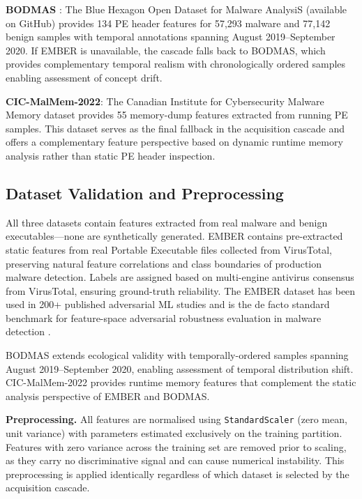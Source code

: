 \documentclass[conference]{IEEEtran}
\begin{document}
\textbf{BODMAS} \cite{yang2021}: The Blue Hexagon Open Dataset for Malware AnalysiS (available on GitHub) provides 134 PE header features for 57,293 malware and 77,142 benign samples with temporal annotations spanning August 2019--September 2020. If EMBER is unavailable, the cascade falls back to BODMAS, which provides complementary temporal realism with chronologically ordered samples enabling assessment of concept drift.

\textbf{CIC-MalMem-2022}: The Canadian Institute for Cybersecurity Malware Memory dataset provides 55 memory-dump features extracted from running PE samples. This dataset serves as the final fallback in the acquisition cascade and offers a complementary feature perspective based on dynamic runtime memory analysis rather than static PE header inspection.

\subsection{Dataset Validation and Preprocessing}

All three datasets contain features extracted from real malware and benign executables---none are synthetically generated. EMBER contains pre-extracted static features from real Portable Executable files collected from VirusTotal, preserving natural feature correlations and class boundaries of production malware detection. Labels are assigned based on multi-engine antivirus consensus from VirusTotal, ensuring ground-truth reliability. The EMBER dataset has been used in 200+ published adversarial ML studies and is the de facto standard benchmark for feature-space adversarial robustness evaluation in malware detection \cite{anderson2018}.

BODMAS extends ecological validity with temporally-ordered samples spanning August 2019--September 2020, enabling assessment of temporal distribution shift. CIC-MalMem-2022 provides runtime memory features that complement the static analysis perspective of EMBER and BODMAS.

\textbf{Preprocessing.} All features are normalised using \texttt{StandardScaler} (zero mean, unit variance) with parameters estimated exclusively on the training partition. Features with zero variance across the training set are removed prior to scaling, as they carry no discriminative signal and can cause numerical instability. This preprocessing is applied identically regardless of which dataset is selected by the acquisition cascade.
\end{document}
